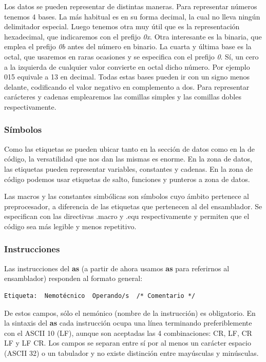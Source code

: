 Los datos se pueden representar de distintas maneras. Para representar números tenemos
4 bases. La más habitual es en su forma decimal, la cual no lleva ningún delimitador
especial. Luego tenemos otra muy útil que es la representación hexadecimal, que
indicaremos con el prefijo {\it 0x}. Otra interesante es la binaria, que emplea el
prefijo {\it 0b} antes del número en binario. La cuarta y última base es la
octal, que usaremos en raras ocasiones y se especifica con el prefijo {\it 0}. Sí, un
cero a la izquierda de cualquier valor convierte en octal dicho número. Por ejemplo
015 equivale a 13 en decimal. Todas estas bases pueden ir con un signo menos delante,
codificando el valor negativo en complemento a dos. Para representar carácteres y cadenas
emplearemos las comillas simples y las comillas dobles respectivamente.

\subsubsection{Símbolos}

Como las etiquetas se pueden ubicar tanto en la sección de datos como en la de código,
la versatilidad que nos dan las mismas es enorme. En la zona de datos, las etiquetas pueden representar
variables, constantes y cadenas. En la zona de código podemos usar etiquetas de salto, funciones y
punteros a zona de datos.

Las macros y las constantes simbólicas son símbolos cuyo ámbito pertenece al preprocesador,
a diferencia de las etiquetas que pertenecen al del ensamblador. Se especifican con las
directivas .macro y .equ respectivamente y permiten que el código sea más legible y menos
repetitivo.

\subsubsection{Instrucciones}

Las instrucciones del {\bf as} (a partir de ahora usamos {\bf as} para referirnos al
ensamblador) responden al formato general:

\begin{lstlisting}
Etiqueta:  Nemotécnico  Operando/s  /* Comentario */
\end{lstlisting}

De estos campos, sólo el nemónico (nombre de la instrucción) es obligatorio. En
la sintaxis del {\bf as} cada instrucción ocupa una línea terminando preferiblemente
con el ASCII 10 (LF), aunque son aceptadas las 4 combinaciones: CR, LF, CR LF y LF CR.
Los campos se separan entre sí por al menos un carácter espacio (ASCII 32) o un tabulador
y no existe distinción entre mayúsculas y minúsculas.

